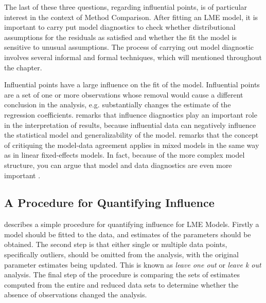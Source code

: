 \documentclass[12pt, a4paper]{report}
\theoremstyle{plain}
\theoremstyle{definition}
\theoremstyle{remark}
\begin{document}
	The last of these three questions, regarding influential points, is of particular interest in the context of Method Comparison. After fitting an LME model, it is important to carry put model diagnostics to check whether distributional assumptions for the
	residuals as satisfied and whether the fit the model is sensitive to unusual assumptions. The process of carrying out model
	diagnostic involves several informal and formal techniques, which will mentioned throughout the chapter.

Influential points have a large influence on the fit of the model. Influential points are a set of one or more observations whose removal would cause a different conclusion in the analysis, e.g. substantially changes the estimate of the regression coefficients. \citet{west} remarks that influence diagnostics play an important role in the interpretation of results, because influential data can negatively 
	influence the statistical model and generalizability of the model.
	\citet{schabenberger} remarks that the concept of critiquing the model-data agreement applies in mixed models in the same way as in linear
	fixed-effects models. In fact, because of the more complex model structure, you can argue that model and
	data diagnostics are even more important \citep{west}.
	
	
		\subsection{A Procedure for Quantifying Influence}  
		
		\citet{schabenberger} describes a simple procedure for quantifying influence for LME Models. Firstly a model should be fitted to the data, and
		estimates of the parameters should be obtained. The second step is that either single or multiple data points, specifically outliers,
		should be omitted from the analysis, with the original parameter estimates being updated. This is known as \textit{leave one out} or \textit{leave k out} analysis. The final step of the procedure is comparing the sets of estimates computed from the entire and reduced data sets to determine whether the absence of observations changed the
		analysis. 
\end{document}
